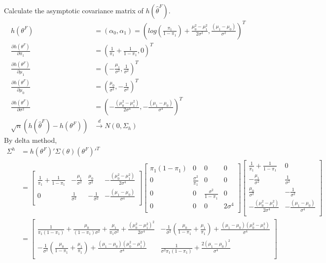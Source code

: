 \documentclass[11pt]{article} %
\begin{document}
	Calculate the asymptotic covariance matrix of $h(\hat\theta^F )$.
	\begin{align*}    
		h(\theta^F ) &= (\alpha_0, \alpha_1)= \left(log(\frac{\pi_1}{1-\pi_1}) +\frac{\mu_0^2 - \mu_1^2}{2\sigma^2},  \frac{(\mu_1-\mu_0)}{\sigma^2} \right)^T\\
		\frac{\partial h(\theta^F)}{\partial \pi_1} & = (\frac{1}{\pi_1}+\frac{1}{1-\pi_1} , 0)^T\\
		\frac{\partial h(\theta^F )}{\partial \mu_1} & = (-\frac{\mu_1}{\sigma^2}, \frac{1}{\sigma^2})^T\\
		\frac{\partial h(\theta^F )}{\partial \mu_0} & = (\frac{\mu_0}{\sigma^2}, -\frac{1}{\sigma^2})^T\\
		\frac{\partial h(\theta^F )}{\partial \sigma^2} & = \left(-\frac{(\mu_0^2 - \mu_1^2)}{2\sigma^4}, -\frac{(\mu_1-\mu_0)}{\sigma^4} \right)^T\\
		\sqrt{n} (h(\hat\theta^F ) - h(\theta^F )) & \xrightarrow[]{d} N \left(0, \Sigma_ h \right)
	\end{align*}   
	By delta method, 
	\begin{align*}    
		\Sigma^{h} &= h(\theta^F )'\Sigma(\theta) (\theta^F )'^T\\
		&=\begin{bmatrix}
			\frac{1}{\pi_1}+\frac{1}{1-\pi_1} & -\frac{\mu_1}{\sigma^2} & \frac{\mu_0}{\sigma^2} &-\frac{(\mu_0^2 - \mu_1^2)}{2\sigma^4}\\
			0 & \frac{1}{\sigma^2} & -\frac{1}{\sigma^2} & -\frac{(\mu_1-\mu_0)}{\sigma^4}\\
		\end{bmatrix}\begin{bmatrix}
			\pi_1(1-\pi_1) & 0 & 0 & 0\\
			0 & \frac{\sigma^2}{ \pi_1} & 0 & 0\\
			0 & 0 & \frac{\sigma^2}{ 1-\pi_1} & 0\\
			0 & 0 & 0 & 2\sigma^4 \\
		\end{bmatrix}\begin{bmatrix}
			\frac{1}{\pi_1}+\frac{1}{1-\pi_1} & 0 \\
			-\frac{\mu_1}{\sigma^2} & \frac{1}{\sigma^2}\\
			\frac{\mu_0}{\sigma^2} & -\frac{1}{\sigma^2}\\
			-\frac{(\mu_0^2 - \mu_1^2)}{2\sigma^4} & -\frac{(\mu_1-\mu_0)}{\sigma^4} \\
		\end{bmatrix}\\
		&= \begin{bmatrix}
			\frac{1}{\pi_1(1-\pi_1)} + \frac{\mu_0}{(1-\pi_1)\sigma^2} + \frac{\mu_1}{\pi_1\sigma^2} + \frac{(\mu_0^2 - \mu_1^2)^2}{2\sigma^4} & -\frac{1}{\sigma^2}(\frac{\mu_0}{1-\pi_1} + \frac{\mu_1}{\pi_1}) + \frac{(\mu_1-\mu_0)(\mu_0^2- \mu_1^2)}{\sigma^4} \\
			-\frac{1}{\sigma^2}(\frac{\mu_0}{1-\pi_1} + \frac{\mu_1}{\pi_1}) + \frac{(\mu_1-\mu_0)(\mu_0^2- \mu_1^2)}{\sigma^4}  & \frac{1}{\sigma^2 \pi_1(1-\pi_1)} + \frac{2(\mu_1-\mu_0)^2}{\sigma^4}\\
		\end{bmatrix}
	\end{align*}   
\end{document}
